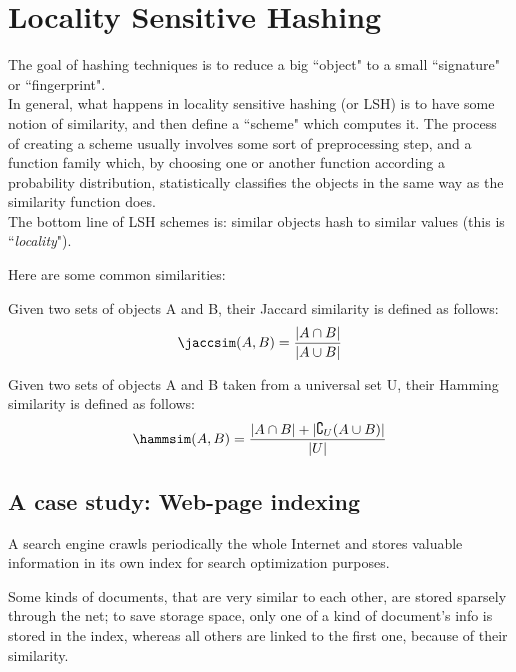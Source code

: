 
\chapter{Locality Sensitive Hashing}
	
	The goal of hashing techniques is to reduce a big ``object" to a small ``signature" or ``fingerprint".\\
	In general, what happens in locality sensitive hashing (or LSH) is to have some notion of similarity, and then define a ``scheme" which computes it. The process of creating a scheme usually involves some sort of preprocessing step, and a function family which, by choosing one or another function according a probability distribution, statistically classifies the objects in the same way as the similarity function does.\\
	The bottom line of LSH schemes is: similar objects hash to similar values (this is ``\textit{locality}").
	
	Here are some common similarities:
	
    \begin{defn}
        Given two sets of objects A and B, their Jaccard similarity is defined as follows:
        \begin{equation}
        \jaccsim(A, B) = \frac{|A\cap B|}{|A\cup B|}
        \end{equation}
    \end{defn}
	
    \begin{defn}
        Given two sets of objects A and B taken from a universal set U, their Hamming similarity is defined as follows:
        \begin{equation}
        \hammsim(A, B) = \frac{|A\cap B| + |\complement_U(A\cup B)|}{|U|}
        \end{equation}
    \end{defn}
	
	
\newpage
\section{A case study: Web-page indexing}\label{sec:web-page-indexing}
	
	A search engine crawls periodically the whole Internet and stores valuable information in its own index for search optimization purposes.
	
    \begin{obs}
        Some kinds of documents, that are very similar to each other, are stored sparsely through the net; to save storage space, only one of a kind of document's info is stored in the index, whereas all others are linked to the first one, because of their similarity.
    \end{obs}
	
